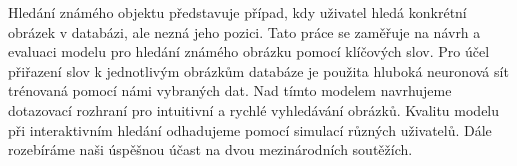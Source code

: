 \documentclass[12pt]{report}
\begin{document}
Hledání známého objektu představuje případ, kdy uživatel hledá konkrétní obrázek v databázi, ale nezná jeho pozici. Tato práce se zaměřuje na návrh a evaluaci modelu pro hledání známého obrázku pomocí klíčových slov. Pro účel přiřazení slov k jednotlivým obrázkům databáze je použita hluboká neuronová sít trénovaná pomocí námi vybraných dat. Nad tímto modelem navrhujeme dotazovací rozhraní pro intuitivní a rychlé vyhledávání obrázků. Kvalitu modelu při interaktivním hledání odhadujeme pomocí simulací různých uživatelů. Dále rozebíráme naši úspěšnou účast na dvou mezinárodních soutěžích.
\end{document}
